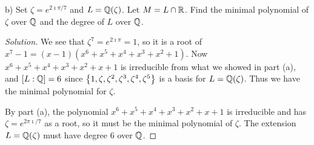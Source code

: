 \begin{que}
b) Set $\zeta = e^{2\imath\pi/7}$ and $L = \mathbb{Q}(\zeta)$. Let $M = L \cap \mathbb{R}$. Find the minimal polynomial of $\zeta$ over $\mathbb{Q}$ and the degree of $L$ over $\mathbb{Q}$.

\begin{proof}[Solution]
We see that $\zeta^7 = e^{2\imath\pi} = 1$, so it is a root of $x^7 - 1 = (x - 1)(x^6 + x^5 + x^4 + x^3 + x^2 + 1)$. Now $x^6 + x^5 + x^4 + x^3 + x^2 + x + 1$ is irreducible from what we showed in part (a), and $[L : \mathbb{Q}] = 6$ since $\left\{1, \zeta, \zeta^2, \zeta^3, \zeta^4, \zeta^5\right\}$ is a basis for $L = \mathbb{Q}(\zeta)$. Thus we have the minimal polynomial for $\zeta$.

{\color{blue}By part (a), the polynomial $x^6 + x^5 + x^4 + x^3 + x^2 + x + 1$ is irreducible and has $\zeta = e^{2\pi\imath / 7}$ as a root, so it must be the minimal polynomial of $\zeta$. The extension $L = \mathbb{Q}(\zeta)$ must have degree $6$ over $\mathbb{Q}$.}
\end{proof}
\end{que}

